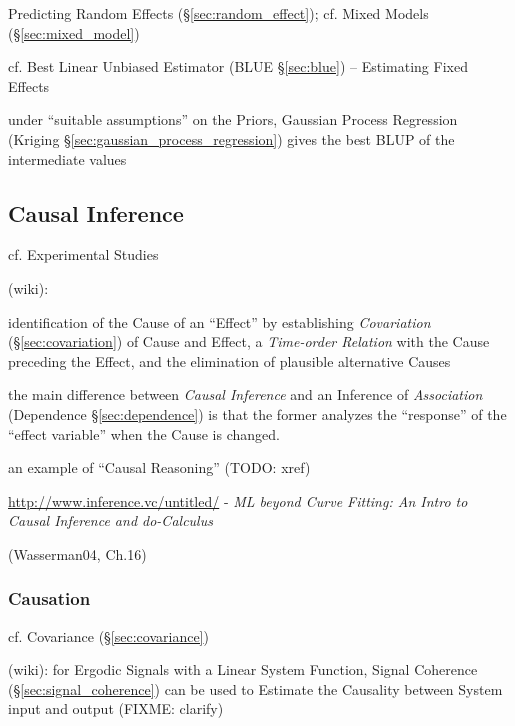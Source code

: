 Predicting Random Effects (\S\ref{sec:random_effect});
cf. Mixed Models (\S\ref{sec:mixed_model})

cf. Best Linear Unbiased Estimator (BLUE \S\ref{sec:blue}) -- Estimating
Fixed Effects

under ``suitable assumptions'' on the Priors, Gaussian Process Regression
(Kriging \S\ref{sec:gaussian_process_regression}) gives the best BLUP of the
intermediate values



\subsection{Causal Inference}\label{sec:causal_inference}

cf. Experimental Studies

(wiki):

identification of the Cause of an ``Effect'' by establishing \emph{Covariation}
(\S\ref{sec:covariation}) of Cause and Effect, a \emph{Time-order Relation} with
the Cause preceding the Effect, and the elimination of plausible alternative
Causes

the main difference between \emph{Causal Inference} and an Inference of
\emph{Association} (Dependence \S\ref{sec:dependence}) is that the former
analyzes the ``response'' of the ``effect variable'' when the Cause is changed.

an example of ``Causal Reasoning'' (TODO: xref)

\url{http://www.inference.vc/untitled/} - \emph{ML beyond Curve Fitting: An
  Intro to Causal Inference and do-Calculus}

(Wasserman04, Ch.16)



\subsubsection{Causation}\label{sec:causation}


cf. Covariance (\S\ref{sec:covariance})

\fist (wiki): for Ergodic Signals with a Linear System Function, Signal
Coherence (\S\ref{sec:signal_coherence}) can be used to Estimate the Causality
between System input and output (FIXME: clarify)



